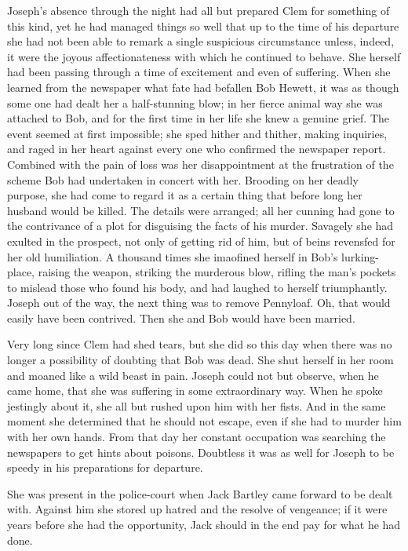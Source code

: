 Joseph's absence through the night had all but prepared Clem for
something of this kind, yet he had managed things so well that up to the
time of his departure she had not been able to remark a single
suspicious circumstance {\protect\hypertarget{239}{}{}}unless, indeed,
it were the joyous affectionateness with which he continued to behave.
She herself had been passing through a time of excitement and even of
suffering. When she learned from the newspaper what fate had befallen
Bob Hewett, it was as though some one had dealt her a half-stunning
blow; in her fierce animal way she was attached to Bob, and for the
first time in her life she knew a genuine grief. The event seemed at
first impossible; she sped hither and thither, making inquiries, and
raged in her heart against every one who confirmed the newspaper report.
Combined with the pain of loss was her disappointment at the frustration
of the scheme Bob had undertaken in concert with her. Brooding on her
deadly purpose, she had come to regard it as a certain thing that before
long her husband would be killed. The details were arranged; all her
cunning had gone to the contrivance of a plot for disguising the facts
of his murder. Savagely she had exulted in the prospect, not only of
getting rid of him, but of beins revensfed for her old humiliation. A
thousand times she imaofined herself in Bob's lurking-place, raising the
weapon, {\protect\hypertarget{240}{}{}}striking the murderous blow,
rifling the man's pockets to mislead those who found his body, and had
laughed to herself triumphantly. Joseph out of the way, the next thing
was to remove Pennyloaf. Oh, that would easily have been contrived. Then
she and Bob would have been married.

Very long since Clem had shed tears, but she did so this day when there
was no longer a possibility of doubting that Bob was dead. She shut
herself in her room and moaned like a wild beast in pain. Joseph could
not but observe, when he came home, that she was suffering in some
extraordinary way. When he spoke jestingly about it, she all but rushed
upon him with her fists. And in the same moment she determined that he
should not escape, even if she had to murder him with her own hands.
From that day her constant occupation was searching the newspapers to
get hints about poisons. Doubtless it was as well for Joseph to be
speedy in his preparations for departure.

She was present in the police-court when Jack Bartley came forward to be
dealt with. Against him she stored up hatred and the
{\protect\hypertarget{241}{}{}}resolve of vengeance; if it were years
before she had the opportunity, Jack should in the end pay for what he
had done.

